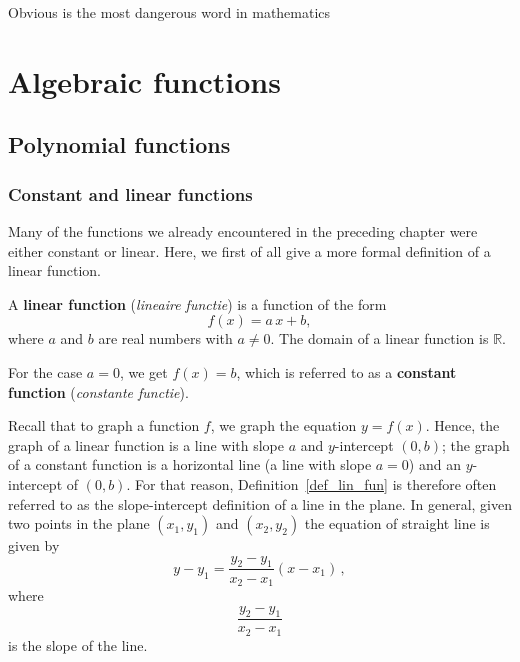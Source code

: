 \begin{savequote}[75mm]
Obvious is the most dangerous word in mathematics
\end{savequote}


\chapter{Algebraic functions}
\graphicspath{{figures/Algebraic/}}
\label{chap_algebraic}

\section{Polynomial functions}
\label{sec_pol}
\subsection{Constant and linear functions}
\label{Constant_lin_fun}
Many of the functions we already encountered in the preceding chapter were either constant or linear. Here, we first of all give a more formal definition of a linear function. 

\begin{definition}
\label{def_lin_fun}
 A  \textbf{linear function} (\textit{lineaire functie}) is a function of the form \[ f(x) = a\,x + b,\] where $a$ and $b$ are real numbers with $a \neq 0$.  The domain of a linear function is $\mathbb{R}$.%
\end{definition}


For the case $a=0$, we get $f(x) = b$, which is referred to as a \textbf{constant function} (\textit{constante functie}).



Recall that to graph a function $f$, we graph the equation $y=f(x)$. Hence, the graph of a linear function is a line with slope $a$ and $y$-intercept $(0,b)$; the graph of a constant function is a horizontal line (a line with slope $a = 0$) and an $y$-intercept of $(0,b)$. For that reason, Definition~\ref{def_lin_fun} is therefore often referred to as the slope-intercept definition of a line in the plane.   In general, given two points in the plane $(x_1,y_1)$ and $(x_2,y_2)$  the equation of straight line is given by
\begin{equation}
y-y_1=\dfrac{y_2-y_1}{x_2-x_1}\left(x-x_1\right)\,,
    \label{vglrechte}
\end{equation}
where 
$$\dfrac{y_2-y_1}{x_2-x_1}$$
is the slope of the line. 


